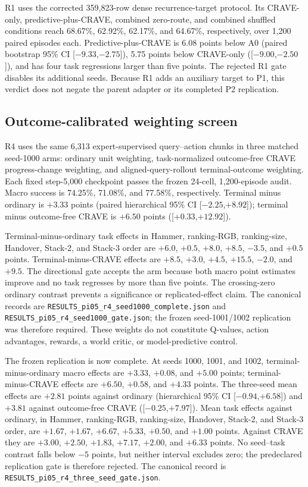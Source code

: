 R1 uses the corrected 359,823-row dense recurrence-target protocol.  Its
CRAVE-only, predictive-plus-CRAVE, combined zero-route, and combined shuffled
conditions reach 68.67\%, 62.92\%, 62.17\%, and 64.67\%, respectively, over
1,200 paired episodes each.  Predictive-plus-CRAVE is 6.08 points below A0
(paired bootstrap 95\% CI [$-9.33$,$-2.75$]), 5.75 points below CRAVE-only
([$-9.00$,$-2.50$]), and has four task regressions larger than five points.
The rejected R1 gate disables its additional seeds.  Because R1 adds an
auxiliary target to P1, this verdict does not negate the parent adapter or its
completed P2 replication.

\subsection{Outcome-calibrated weighting screen}
R4 uses the same 6,313 expert-supervised query--action chunks in three matched
seed-1000 arms: ordinary unit weighting, task-normalized outcome-free CRAVE
progress-change weighting, and aligned-query-rollout terminal-outcome weighting.
Each fixed step-5,000
checkpoint passes the frozen 24-cell, 1,200-episode audit.  Macro success is
74.25\%, 71.08\%, and 77.58\%, respectively.  Terminal minus ordinary is
$+3.33$ points (paired hierarchical 95\% CI [$-2.25$,$+8.92$]); terminal
minus outcome-free CRAVE is $+6.50$ points ([$+0.33$,$+12.92$]).

Terminal-minus-ordinary task effects in Hammer, ranking-RGB, ranking-size,
Handover, Stack-2, and Stack-3 order are $+6.0$, $+0.5$, $+8.0$, $+8.5$,
$-3.5$, and $+0.5$ points.  Terminal-minus-CRAVE effects are $+8.5$, $+3.0$,
$+4.5$, $+15.5$, $-2.0$, and $+9.5$.  The directional gate accepts the arm
because both macro point estimates improve and no task regresses by more than
five points.  The crossing-zero ordinary contrast prevents a significance or
replicated-effect claim.  The canonical records are
\texttt{RESULTS\_pi05\_r4\_seed1000\_complete.json} and
\texttt{RESULTS\_pi05\_r4\_seed1000\_gate.json}; the frozen seed-1001/1002
replication was therefore required.  These weights do not constitute Q-values,
action advantages, rewards, a world critic, or model-predictive control.

The frozen replication is now complete.  At seeds 1000, 1001, and 1002,
terminal-minus-ordinary macro effects are $+3.33$, $+0.08$, and $+5.00$
points; terminal-minus-CRAVE effects are $+6.50$, $+0.58$, and $+4.33$ points.
The three-seed mean effects are $+2.81$ points against ordinary (hierarchical
95\% CI [$-0.94$,$+6.58$]) and $+3.81$ against outcome-free CRAVE
([$-0.25$,$+7.97$]).  Mean task effects against ordinary, in Hammer,
ranking-RGB, ranking-size, Handover, Stack-2, and Stack-3 order, are $+1.67$,
$+1.67$, $+6.67$, $+5.33$, $+0.50$, and $+1.00$ points.  Against CRAVE they
are $+3.00$, $+2.50$, $+1.83$, $+7.17$, $+2.00$, and $+6.33$ points.  No
seed--task contrast falls below $-5$ points, but neither interval excludes
zero; the predeclared replication gate is therefore rejected.  The canonical
record is \texttt{RESULTS\_pi05\_r4\_three\_seed\_gate.json}.

